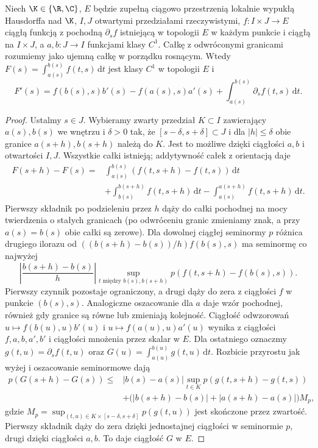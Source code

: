 \begin{twierdzenie}
\label{thm:leibniz-moving15a}
Niech $\K\in\{\R,\C\}$, $E$ będzie zupełną ciągowo
przestrzenią lokalnie wypukłą Hausdorffa nad $\K$,
$I,J$ otwartymi przedziałami rzeczywistymi, $f:I\times J\to E$ ciągłą funkcją
z pochodną $\partial_s f$ istniejącą w topologii $E$
w każdym punkcie i ciągłą na $I\times J$, a $a,b:J\to I$
funkcjami klasy $C^1$. Całkę z odwróconymi granicami
rozumiemy jako ujemną całkę w porządku rosnącym.
Wtedy $F(s)=\int_{a(s)}^{b(s)}f(t,s)\,\mathrm dt$
jest klasy $C^1$ w topologii $E$ i
\[
 F'(s)=f(b(s),s)b'(s)-f(a(s),s)a'(s)
       +\int_{a(s)}^{b(s)}\partial_s f(t,s)\,\mathrm dt.
\]
\end{twierdzenie}
\begin{proof}
Ustalmy $s\in J$. Wybieramy zwarty przedział $K\subset I$
zawierający $a(s),b(s)$ we wnętrzu i $\delta>0$ tak, że
$[s-\delta,s+\delta]\subset J$ i dla $|h|\le\delta$ obie
granice $a(s+h),b(s+h)$ należą do $K$.
Jest to możliwe dzięki ciągłości $a,b$ i otwartości $I,J$. Wszystkie całki
istnieją; addytywność całek z orientacją daje
\[
 \begin{split}
 F(s+h)-F(s)={}&
 \int_{a(s)}^{b(s)}(f(t,s+h)-f(t,s))\,\mathrm dt\\
 &+\int_{b(s)}^{b(s+h)} f(t,s+h)\,\mathrm dt
 -\int_{a(s)}^{a(s+h)} f(t,s+h)\,\mathrm dt.
 \end{split}
\]
Pierwszy składnik po podzieleniu przez $h$ dąży
do całki pochodnej na mocy twierdzenia o stałych
granicach (po odwróceniu granic zmieniamy znak,
a przy $a(s)=b(s)$ obie całki są zerowe).
Dla dowolnej ciągłej seminormy $p$
różnica drugiego ilorazu od
$((b(s+h)-b(s))/h)f(b(s),s)$ ma seminormę co najwyżej
\[
 \left|\frac{b(s+h)-b(s)}h\right|
 \sup_{t\text{ między }b(s),b(s+h)}
 p(f(t,s+h)-f(b(s),s)).
\]
Pierwszy czynnik pozostaje ograniczony, a drugi
dąży do zera z ciągłości $f$ w punkcie $(b(s),s)$.
Analogiczne oszacowanie dla $a$ daje wzór pochodnej,
również gdy granice są równe lub zmieniają kolejność.
Ciągłość odwzorowań $u\mapsto f(b(u),u)b'(u)$
i $u\mapsto f(a(u),u)a'(u)$ wynika z ciągłości $f,a,b,a',b'$
i ciągłości mnożenia przez skalar w $E$. Dla ostatniego oznaczmy $g(t,u)=\partial_s f(t,u)$ oraz
$G(u)=\int_{a(u)}^{b(u)}g(t,u)\,\mathrm dt$.
Rozbicie przyrostu jak wyżej i oszacowanie seminormowe dają
\[
\begin{split}
 p(G(s+h)-G(s))\le{}&
 |b(s)-a(s)|\sup_{t\in K}p(g(t,s+h)-g(t,s))\\
 &+\bigl(|b(s+h)-b(s)|+|a(s+h)-a(s)|\bigr)M_p,
\end{split}
\]
gdzie $M_p=\sup_{(t,u)\in K\times[s-\delta,s+\delta]}p(g(t,u))$
jest skończone przez zwartość. Pierwszy składnik dąży
do zera dzięki jednostajnej ciągłości w seminormie $p$,
drugi dzięki ciągłości $a,b$. To daje ciągłość $G$ w $E$.
\end{proof}

